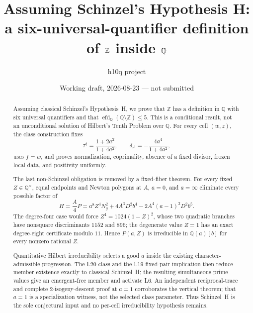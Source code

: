 \documentclass[11pt]{amsart}
\title[Schinzel-H conditional six-quantifier definition of $\Z$ in $\Q$]
      {Assuming Schinzel's Hypothesis H:\\
       a six-universal-quantifier definition of $\Z$ inside $\Q$}
\author{h10q project}
\date{Working draft, 2026-08-23 --- not submitted}
\theoremstyle{definition}
\theoremstyle{remark}
\newcommand{\Q}{\mathbb{Q}}
\newcommand{\Z}{\mathbb{Z}}
\begin{document}
\begin{abstract}
Assuming classical Schinzel's Hypothesis~H, we prove that $\Z$ has a
definition in $\Q$ with six universal quantifiers and that
$\operatorname{efd}_{\Q}(\Q\setminus\Z)\le5$.  This is a conditional
result, not an unconditional solution of Hilbert's Tenth Problem over
$\Q$.  For every cell $(w,z)$, the class construction fixes
\[
 \tau^\dagger=\frac{1+2a^2}{1+4a^2},
 \qquad \delta_{\tau^\dagger}=-\frac{4a^4}{1+4a^2},
\]
uses $f=w$, and proves normalization, coprimality, absence of a fixed
divisor, frozen local data, and positivity uniformly.

The last non-Schinzel obligation is removed by a fixed-fiber theorem.  For
every fixed $Z\in\Q^\times$, equal endpoints and Newton polygons at $A$,
$a=0$, and $a=\infty$ eliminate every possible factor of
\[
 H=\frac A4P
 =a^8Z^4N_g^2+4A^3D^2b^4-2A^4(a-1)^2D^2b^5.
\]
The degree-four case would force
$Z^4=1024(1-Z)^2$, whose two quadratic branches have nonsquare
discriminants $1152$ and $896$; the degenerate value $Z=1$ has an exact
degree-eight certificate modulo $11$.  Hence $P(a,Z)$ is irreducible in
$\Q(a)[b]$ for every nonzero rational $Z$.

Quantitative Hilbert irreducibility selects a good $a$ inside the existing
character-admissible progression.  The L20 class and the L19 fixed-pair
implication then reduce member existence exactly to classical Schinzel~H;
the resulting simultaneous prime values give an emergent-free member and
activate L6.  An independent reciprocal-trace and complete
$2$-isogeny-descent proof at $a=1$ corroborates the vertical theorem;
that $a=1$ is a specialization witness, not the selected class parameter.
Thus Schinzel~H is the sole conjectural input and no per-cell
irreducibility hypothesis remains.


\end{abstract}
\end{document}

